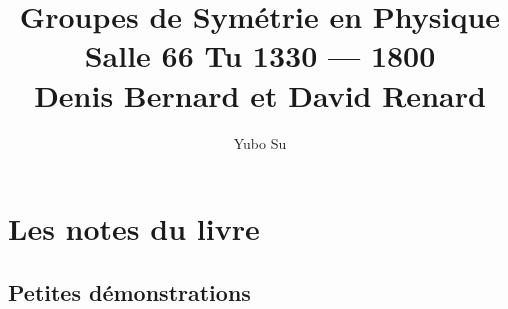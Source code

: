 \documentclass[10pt]{report}
\begin{document}
\title{Groupes de Sym\'etrie en Physique\\ Salle 66 Tu 1330 --- 1800\\ Denis Bernard et David Renard}
\author{Yubo Su}
\date{}

\maketitle
\tableofcontents

\chapter{Les notes du livre}

\section{Petites d\'emonstrations}
\end{document}
